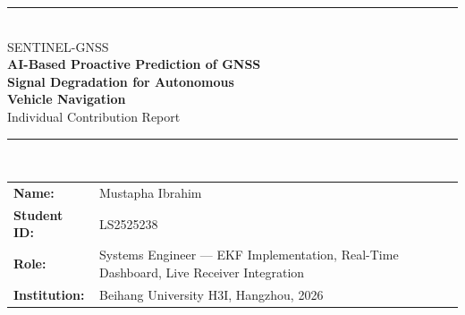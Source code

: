 \documentclass[12pt,a4paper]{article}
\newcommand{\code}[1]{\texttt{#1}}
\begin{document}

\begin{center}
  {\color{buaaNavy}\rule{\linewidth}{2pt}}\\[0.5cm]
  {\normalsize\color{buaaBlue} SENTINEL-GNSS}\\[0.25cm]
  {\LARGE\bfseries\color{buaaNavy} AI-Based Proactive Prediction of GNSS\\[0.2cm]
   Signal Degradation for Autonomous\\[0.4cm]
   Vehicle Navigation}\\[0.45cm]
  {\large\color{buaaBlue} Individual Contribution Report}\\[0.5cm]
  {\color{buaaNavy}\rule{\linewidth}{2pt}}\\[0.8cm]

  \begin{tabular}{ll}
    \textbf{Name:}        & Mustapha Ibrahim \\
    \textbf{Student ID:}  & LS2525238 \\
    \textbf{Role:}        & Systems Engineer --- EKF Implementation, Real-Time Dashboard,
                            Live Receiver Integration \\
    \textbf{Institution:} & Beihang University H3I, Hangzhou, 2026 \\
  \end{tabular}
\end{center}
\vspace{0.8cm}

\begin{abstract}
This report documents my contributions to the SENTINEL-GNSS pilot project in full
technical depth.
My role was systems engineering: bridging the mathematical models designed by Joel with
a running, demonstrable system.

I made three primary contributions.
\textbf{First}, I implemented the initial 9-state Extended Kalman Filter skeleton in
\code{src/models/ekf.py} --- the predict step, the measurement update step, the
SENTINEL-adaptive measurement noise covariance, and the simulated blockage validation
experiment that confirmed the Kalman gain correctly responds to SENTINEL's predictions.
\textbf{Second}, I designed and built the five-panel real-time monitoring dashboard
in Plotly Dash, covering interactive trajectory visualisation, signal quality time series,
SENTINEL probability gauges, sky plot, and a fusion status indicator.
I solved the \code{dcc.Store} race condition that prevented simultaneous panel updates at
1\,Hz.
\textbf{Third}, I connected the dashboard to the live Septentrio Mosaic-X5C receiver
in Room~3058 via USB serial, implemented NMEA/UBX sentence parsing, verified the live
feature extraction pipeline, and ran the live campus demonstration.

I also authored Section~6 (System Demonstration) of the team paper.
The dashboard I built became the primary demonstration vehicle for the SENTINEL-GNSS
project, later extended by Joel to the production Next.js/FastAPI stack.
\end{abstract}
\end{document}
